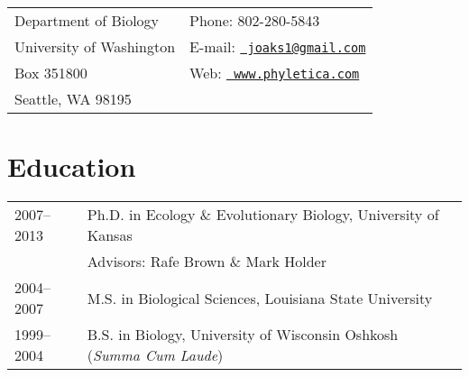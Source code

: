 \documentclass[10pt]{article}
\begin{document}
\raggedright
\singlespacing

\noindent\begin{tabular*}{\textwidth}[tb]{ @{}l @{\extracolsep{\fill}} l@{}}
Department of Biology & Phone: 802-280-5843 \\
University of Washington & E-mail: \href{mailto:joaks1@gmail.com}{\tt
                          joaks1@gmail.com} \\
Box 351800 & Web: \href{http://www.phyletica.com}{\tt
                          www.phyletica.com} \\
Seattle, WA 98195  & \\
\end{tabular*}

\section*{Education}
\noindent\begin{tabulary}{\textwidth}{ @{} l L @{} }
2007--2013 & Ph.D. in Ecology \& Evolutionary Biology, University of Kansas \\
              & \addtolength{\leftskip}{5mm}Advisors:  Rafe Brown \& Mark
                Holder \\[0.25em]
2004--2007    & M.S. in Biological Sciences, Louisiana State University
                \\[0.25em]
1999--2004    & B.S. in Biology, University of Wisconsin Oshkosh (\emph{Summa
                Cum Laude}) \\
\end{tabulary}
\end{document}
